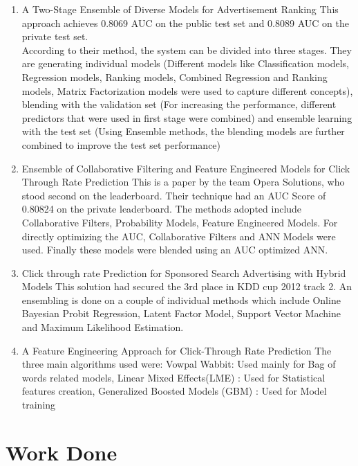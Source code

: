 \documentclass[10pt]{article}
\begin{document}
\begin{enumerate}
	\item A Two-Stage Ensemble of Diverse Models for Advertisement Ranking
This approach achieves 0.8069 AUC on the public test set and 0.8089 AUC on the private test set.\\
According to their method, the system can be divided into three stages. They are generating individual models (Different models like Classification models, Regression models, Ranking models, Combined Regression and Ranking models, Matrix Factorization models were used to capture different concepts), blending with the validation set (For increasing the performance, different predictors that were used in first stage were combined) and ensemble learning with the test set (Using Ensemble methods, the blending models are further combined to improve the test set performance)
	\item Ensemble of Collaborative Filtering and Feature Engineered Models for Click Through Rate Prediction
This is a paper by the team Opera Solutions, who stood second on the leaderboard. Their technique had an AUC Score of 0.80824 on the private leaderboard. The methods adopted include Collaborative Filters, Probability Models, Feature Engineered Models. For directly optimizing the AUC, Collaborative Filters and ANN Models were used. Finally these models were blended using an AUC optimized ANN.\\
	\item Click through rate Prediction for Sponsored Search Advertising with Hybrid Models
This solution had secured the 3rd place in KDD cup 2012 track 2. An ensembling is done on a couple of individual methods which include Online Bayesian Probit Regression, Latent Factor Model, Support Vector Machine and Maximum Likelihood Estimation. \\	
	\item A Feature Engineering Approach for Click-Through Rate Prediction
The three main algorithms used were:
Vowpal Wabbit:  Used mainly for Bag of words related models, Linear Mixed Effects(LME) : Used for Statistical features creation, Generalized Boosted Models (GBM) : Used for Model training\\
 
\end{enumerate}
 
\section{Work Done}
\end{document}
